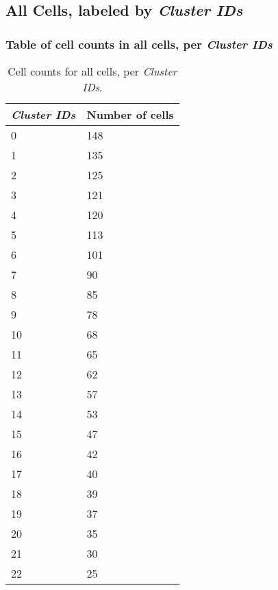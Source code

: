 \clearpage

\subsection{All Cells, labeled by \emph{Cluster IDs}}
\subsubsection{Table of cell counts in all cells, per \emph{Cluster IDs}}\begin{table}[h]
\centering
\label{my-label}
\begin{tabular}{@{}ll@{}}
\toprule

\emph{Cluster IDs}& Number of cells \\ \midrule
0 & 148 \\

1 & 135 \\

2 & 125 \\

3 & 121 \\

4 & 120 \\

5 & 113 \\

6 & 101 \\

7 & 90 \\

8 & 85 \\

9 & 78 \\

10 & 68 \\

11 & 65 \\

12 & 62 \\

13 & 57 \\

14 & 53 \\

15 & 47 \\

16 & 42 \\

17 & 40 \\

18 & 39 \\

19 & 37 \\

20 & 35 \\

21 & 30 \\

22 & 25 \\
\bottomrule
\end{tabular}
\caption{Cell counts for all cells, per \emph{Cluster IDs}.}
\end{table}

